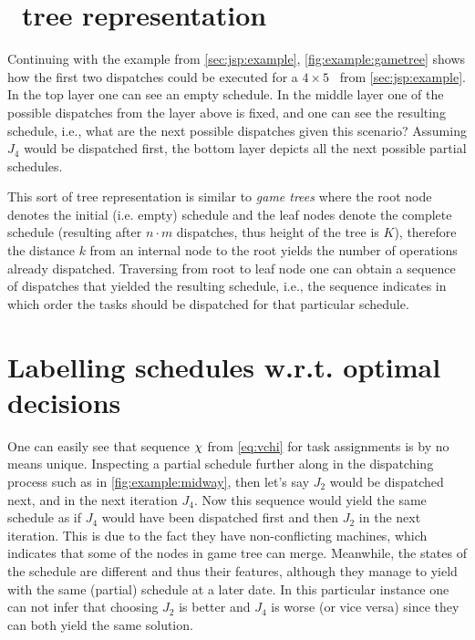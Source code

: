 \section{\Jsp\ tree representation}\label{sec:gen:gametree}
Continuing with the example from \cref{sec:jsp:example}, 
\cref{fig:example:gametree} shows how the first two dispatches could be 
executed for a $4\times5$ \jsp\ from \cref{sec:jsp:example}.
In the top layer one can see an empty schedule.
In the middle layer one of the possible dispatches from the layer above is 
fixed, and one can see the resulting schedule, i.e., what are the next possible 
dispatches given this scenario? Assuming $J_4$ would be dispatched first, the 
bottom layer depicts all the next possible partial schedules.

This sort of tree representation is similar to \emph{game trees} 
\citep[cf.][]{Rosen03} where the root node denotes the initial (i.e. empty) 
schedule and the leaf nodes denote the complete schedule (resulting after 
$n\cdot m$ dispatches, thus height of the tree is $K$), therefore the 
distance $k$ from an internal node to the root yields the number of operations 
already dispatched. Traversing from root to leaf node one can obtain a sequence 
of dispatches that yielded the resulting schedule, i.e., the sequence indicates 
in which order the tasks should be dispatched for that particular schedule. 

\section{Labelling schedules w.r.t. optimal decisions} 
One can easily see that sequence ${\mathbf{\chi}}$ from \cref{eq:vchi} for task 
assignments is by no means unique. 
Inspecting a partial schedule further along in the dispatching process such as 
in \cref{fig:example:midway}, then let's say $J_2$ would be dispatched next, 
and in the next iteration $J_4$. 
Now this sequence would yield the same schedule as if $J_4$ would have been 
dispatched first and then $J_2$ in the next iteration. 
This is due to the fact they have non-conflicting machines, which indicates 
that some of the nodes in game tree can merge. 
Meanwhile, the states of the schedule are different and thus their 
features, although they manage to yield with the same (partial) schedule at a 
later date.  %
In this particular instance one can not infer that choosing $J_2$ is better and 
$J_4$ is worse (or vice versa) since they can both yield the same solution.

